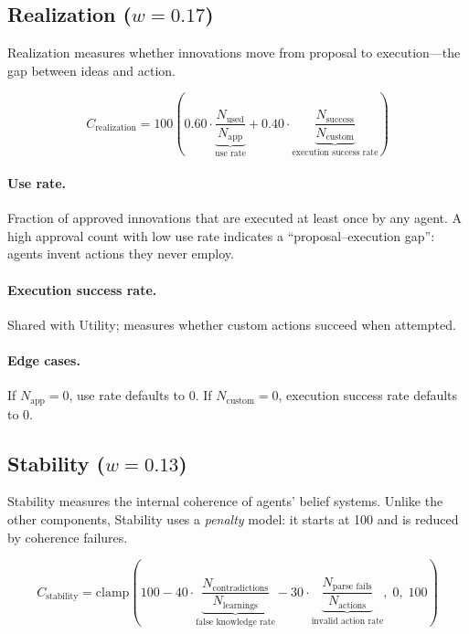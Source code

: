 \documentclass[a4paper, 11pt]{article}
\newcommand{\Napp}{N_{\text{app}}}
\newcommand{\Nused}{N_{\text{used}}}
\newcommand{\Ncustom}{N_{\text{custom}}}
\newcommand{\Nsuccess}{N_{\text{success}}}
\begin{document}
\subsection{Realization ($w = 0.17$)}

Realization measures whether innovations move from proposal to execution---the gap between ideas and action.

\begin{equation}
C_{\text{realization}} = 100 \left(
    0.60 \cdot \underbrace{\frac{\Nused}{\Napp}}_{\text{use rate}}
    + 0.40 \cdot \underbrace{\frac{\Nsuccess}{\Ncustom}}_{\text{execution success rate}}
\right)
\label{eq:realization}
\end{equation}

\paragraph{Use rate.} Fraction of approved innovations that are executed at least once by any agent. A high approval count with low use rate indicates a ``proposal--execution gap'': agents invent actions they never employ.

\paragraph{Execution success rate.} Shared with Utility; measures whether custom actions succeed when attempted.

\paragraph{Edge cases.} If $\Napp = 0$, use rate defaults to $0$. If $\Ncustom = 0$, execution success rate defaults to $0$.

\subsection{Stability ($w = 0.13$)}

Stability measures the internal coherence of agents' belief systems. Unlike the other components, Stability uses a \emph{penalty} model: it starts at 100 and is reduced by coherence failures.

\begin{equation}
C_{\text{stability}} = \text{clamp}\!\left(
    100
    - 40 \cdot \underbrace{\frac{N_{\text{contradictions}}}{N_{\text{learnings}}}}_{\text{false knowledge rate}}
    - 30 \cdot \underbrace{\frac{N_{\text{parse fails}}}{N_{\text{actions}}}}_{\text{invalid action rate}}
    ,\; 0,\; 100
\right)
\label{eq:stability}
\end{equation}
\end{document}
